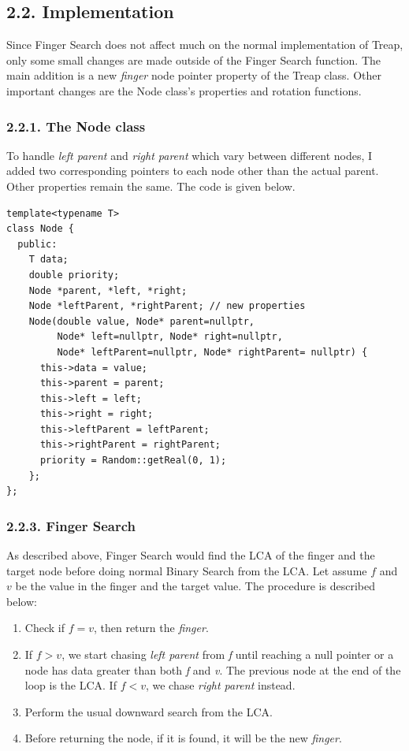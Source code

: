 \documentclass[12pt,english,]{article}
\providecommand{\tightlist}{%
  \setlength{\itemsep}{0pt}\setlength{\parskip}{0pt}}
\begin{document}
\hypertarget{implementation}{%
\subsection{2.2. Implementation}\label{implementation}}

Since Finger Search does not affect much on the normal implementation of
Treap, only some small changes are made outside of the Finger Search
function. The main addition is a new \emph{finger} node pointer property
of the Treap class. Other important changes are the Node class's
properties and rotation functions.

\hypertarget{the-node-class}{%
\subsubsection{2.2.1. The Node class}\label{the-node-class}}

To handle \emph{left parent} and \emph{right parent} which vary between
different nodes, I added two corresponding pointers to each node other
than the actual parent. Other properties remain the same. The code is
given below. \newpage

\begin{lstlisting}
template<typename T>
class Node {
  public:
    T data;
    double priority;
    Node *parent, *left, *right;
    Node *leftParent, *rightParent; // new properties
    Node(double value, Node* parent=nullptr,
         Node* left=nullptr, Node* right=nullptr,
         Node* leftParent=nullptr, Node* rightParent= nullptr) {
      this->data = value;
      this->parent = parent;
      this->left = left;
      this->right = right;
      this->leftParent = leftParent;
      this->rightParent = rightParent;
      priority = Random::getReal(0, 1);
    };
};
\end{lstlisting}
\vspace{-7mm}

\hypertarget{finger-search}{%
\subsubsection{2.2.3. Finger Search}\label{finger-search}}

As described above, Finger Search would find the LCA of the finger and
the target node before doing normal Binary Search from the LCA. Let
assume \(f\) and \(v\) be the value in the finger and the target value.
The procedure is described below:

\begin{enumerate}
\def\labelenumi{\arabic{enumi}.}
\tightlist
\item
  Check if \(f = v\), then return the \emph{finger}.
\item
  If \(f > v\), we start chasing \emph{left parent} from \emph{f} until
  reaching a null pointer or a node has data greater than both \emph{f}
  and \emph{v}. The previous node at the end of the loop is the LCA. If
  \(f < v\), we chase \emph{right parent} instead.
\item
  Perform the usual downward search from the LCA.
\item
  Before returning the node, if it is found, it will be the new
  \emph{finger}.
\end{enumerate}
\end{document}
